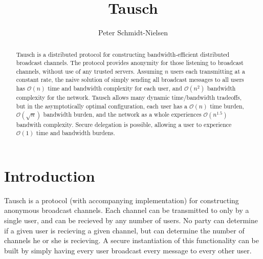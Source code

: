 \documentclass[12pt]{article}
\author{Peter Schmidt-Nielsen}
\title{Tausch}
\begin{document}
\maketitle
\begin{abstract}
Tausch is a distributed protocol for constructing bandwidth-efficient distributed broadcast channels.
The protocol provides anonymity for those listening to broadcast channels, without use of any trusted servers.
Assuming $n$ users each transmitting at a constant rate, the naive solution of simply sending all broadcast messages to all users has $\mathcal{O}(n)$ time and bandwidth complexity for each user, and $\mathcal{O}(n^2)$ bandwidth complexity for the network.
Tausch allows many dynamic time/bandwidth tradeoffs, but in the asymptotically optimal configuration, each user has a $\mathcal{O}(n)$ time burden, $\mathcal{O}(\sqrt{n})$ bandwidth burden, and the network as a whole experiences $\mathcal{O}(n^{1.5})$ bandwith complexity.
Secure delegation is possible, allowing a user to experience $\mathcal{O}(1)$ time and bandwidth burdens.
\end{abstract}

\section{Introduction}
Tausch is a protocol (with accompanying implementation) for constructing anonymous broadcast channels.
Each channel can be transmitted to only by a single user, and can be recieved by any number of users.
No party can determine if a given user is recieving a given channel, but can determine the number of channels he or she is recieving.
A secure instantiation of this functionality can be built by simply having every user broadcast every message to every other user.
\end{document}
